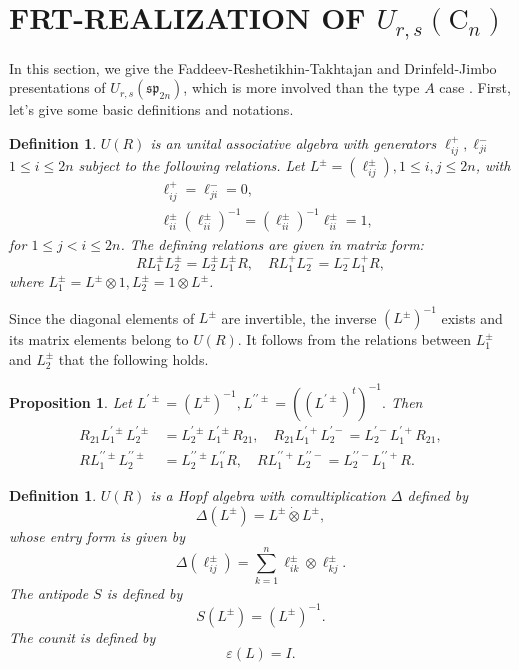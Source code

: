 \documentclass[10pt,a4paper]{amsart}
\newtheorem{defi}[theorem]{Definition}
\newtheorem{proposition}[theorem]{Proposition}
\numberwithin{equation}{section}
\begin{document}
	\section{FRT-REALIZATION OF $U_{r, s}\left(\mathrm{C}_n\right)$}
	In this section, we give the Faddeev-Reshetikhin-Takhtajan
	and Drinfeld-Jimbo presentations of $U_{r, s}\left(\mathfrak{sp}_{2n}\right)$, which is more involved than the type $A$ case \cite{JL1}. First, let's give some basic definitions and notations.
	 	\begin{defi}
	 		$U(R)$ is an unital associative algebra with generators $\ell_{i j}^{+}, \ell_{j i}^{-}$ $1 \leq i \leq 2 n$ subject to the following relations. Let $L^{ \pm}=\left(\ell_{i j}^{ \pm}\right), 1 \leq i, j \leq 2 n$, with
\begin{align*}
&\ell_{i j}^{+}=\ell_{j i}^{-}=0,\\
&\ell^{\pm}_{ii}(\ell^{\pm}_{ii})^{-1}=(\ell^{\pm}_{ii})^{-1}\ell^{\pm}_{ii}=1,
\end{align*}
for $1 \leq j<i \leq 2 n$. The defining relations are given in matrix form:
	 		$$
	 		R L_1^{ \pm} L_2^{ \pm}=L_2^{ \pm} L_1^{ \pm} R, \quad R L_1^{+} L_2^{-}=L_2^{-} L_1^{+}R,
	 		$$
	 		where $L_1^{ \pm}=L^{ \pm} \otimes 1, L_2^{ \pm}=1 \otimes L^{ \pm}$.
	 		\end{defi}
Since the diagonal elements of $L^{\pm}$ are invertible, the inverse $\left(L^{ \pm}\right)^{-1}$ exists and its matrix elements belong to
$U(R)$. It follows from the relations between $L_1^{ \pm}$ and $L_2^{ \pm}$ that the following holds.
	 	\begin{proposition}
	 		Let $L^{\prime \pm}=\left(L^{ \pm}\right)^{-1}, L^{\prime \prime \pm}=\left(\left(L^{\prime \pm}\right)^t\right)^{-1}.$ Then
	 		$$
	 		\begin{aligned}
	 			R_{21} L_1^{\prime \pm} L_2^{\prime \pm} & =L_2^{\prime \pm} L_1^{\prime \pm} R_{21}, \quad R_{21} L_1^{\prime+} L_2^{\prime-}=L_2^{\prime-} L_1^{\prime+} R_{21}, \\
	 			R L_1^{\prime \prime \pm} L_2^{\prime \prime \pm} & =L_2^{\prime \prime \pm} L_1^{\prime \prime} R, \quad R L_1^{\prime \prime+} L_2^{\prime \prime-}=L_2^{\prime \prime-} L_1^{\prime \prime+} R.
	 		\end{aligned}
	 		$$
	 \end{proposition}
 \begin{defi}
 	$U(R)$ is a Hopf algebra with comultiplication $\Delta$ defined by
 	$$\Delta\left(L^{ \pm}\right)=L^{ \pm} \dot{\otimes} L^{ \pm},$$
 	whose entry form is given by
 	$$
 	\Delta\left(\ell_{i j}^{ \pm}\right)=\sum_{k=1}^n \ell_{i k}^{ \pm} \otimes \ell_{k j}^{ \pm}.$$ The antipode $S$ is defined by
 	$$
 	S\left(L^{ \pm}\right)=\left(L^{ \pm}\right)^{-1}.
 	$$
 	The counit is defined by
 	$$
 	\varepsilon(L)=I .
 	$$	
 \end{defi}	
\end{document}

